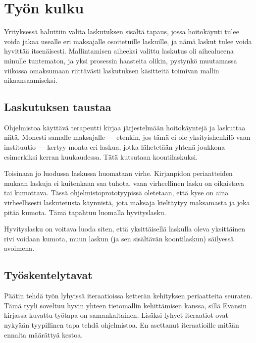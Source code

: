 \hypertarget{tyuxf6n-kulku}{%
\chapter{Työn kulku}\label{tyuxf6n-kulku}}

Yrityksessä haluttiin valita laskutuksen sisältä tapaus, jossa
hoitokäynti tulee voida jakaa usealle eri maksajalle osoitetuille
laskuille, ja nämä laskut tulee voida hyvittää itsenäisesti.
Mallintamisen aiheeksi valittu laskutus oli aihealueena minulle
tuntematon, ja yksi prosessin haasteita olikin, pystynkö muutamassa
viikossa omaksumaan riittävästi laskutuksen käsitteitä toimivan mallin
aikaansaamiseksi.

\hypertarget{laskutuksen-taustaa}{%
\section{Laskutuksen taustaa}\label{laskutuksen-taustaa}}

Ohjelmistoa käyttävä terapeutti kirjaa järjestelmään hoitokäyntejä ja
laskuttaa niitä. Monesti samalle maksajalle --- etenkin, jos tämä ei ole
yksityishenkilö vaan instituutio --- kertyy monta eri laskua, jotka
lähetetään yhtenä joukkona esimerkiksi kerran kuukaudessa. Tätä
kutsutaan koontilaskuksi.

Toisinaan jo luodussa laskussa huomataan virhe. Kirjanpidon
periaatteiden mukaan laskuja ei kuitenkaan saa tuhota, vaan virheellinen
lasku on oikaistava tai kumottava. Tässä ohjelmistoprototyypissä
oletetaan, että kyse on aina virheellisesti laskutetusta käynnistä, jota
maksaja kieltäytyy maksamasta ja joka pitää kumota. Tämä tapahtuu
luomalla hyvityslasku.

Hyvityslasku on voitava luoda siten, että yksittäisellä laskulla oleva
yksittäinen rivi voidaan kumota, muun laskun (ja sen sisältävän
koontilaskun) säilyessä avoimena.

\hypertarget{tyuxf6skentelytavat}{%
\section{Työskentelytavat}\label{tyuxf6skentelytavat}}

Päätin tehdä työn lyhyissä iteraatioissa ketterän kehityksen
periaatteita seuraten. Tämä tyyli soveltuu hyvin yhteen tietomallin
kehittämisen kanssa, sillä Evansin kirjassa kuvattu työtapa on
samankaltainen. Lisäksi lyhyet iteraatiot ovat nykyään tyypillinen tapa
tehdä ohjelmistoa.\cites{ConsultancyEu2020May}{AgileIteration} En
asettanut iteraatioille mitään ennalta määrättyä kestoa.

